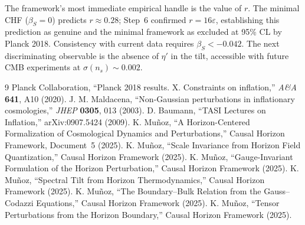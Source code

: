 \documentclass[12pt,a4paper]{article}
\begin{document}
The framework's most immediate empirical handle is the value of $r$. The minimal CHF ($\beta_S = 0$) predicts $r \approx 0.28$; Step~6 confirmed $r = 16\varepsilon$, establishing this prediction as genuine and the minimal framework as excluded at 95\% CL by Planck 2018. Consistency with current data requires $\beta_S < -0.042$. The next discriminating observable is the absence of $\eta'$ in the tilt, accessible with future CMB experiments at $\sigma(n_s) \sim 0.002$.

\begin{thebibliography}{9}
 Planck Collaboration, ``Planck 2018 results. X. Constraints on inflation,'' \textit{A\&A} \textbf{641}, A10 (2020).
 J. M. Maldacena, ``Non-Gaussian perturbations in inflationary cosmologies,'' \textit{JHEP} \textbf{0305}, 013 (2003).
 D. Baumann, ``TASI Lectures on Inflation,'' arXiv:0907.5424 (2009).
 K. Mu\~noz, ``A Horizon-Centered Formalization of Cosmological Dynamics and Perturbations,'' Causal Horizon Framework, Document~5 (2025).
 K. Mu\~noz, ``Scale Invariance from Horizon Field Quantization,'' Causal Horizon Framework (2025).
 K. Mu\~noz, ``Gauge-Invariant Formulation of the Horizon Perturbation,'' Causal Horizon Framework (2025).
 K. Mu\~noz, ``Spectral Tilt from Horizon Thermodynamics,'' Causal Horizon Framework (2025).
 K. Mu\~noz, ``The Boundary--Bulk Relation from the Gauss--Codazzi Equations,'' Causal Horizon Framework (2025).
 K. Mu\~noz, ``Tensor Perturbations from the Horizon Boundary,'' Causal Horizon Framework (2025).
\end{thebibliography}
\end{document}

